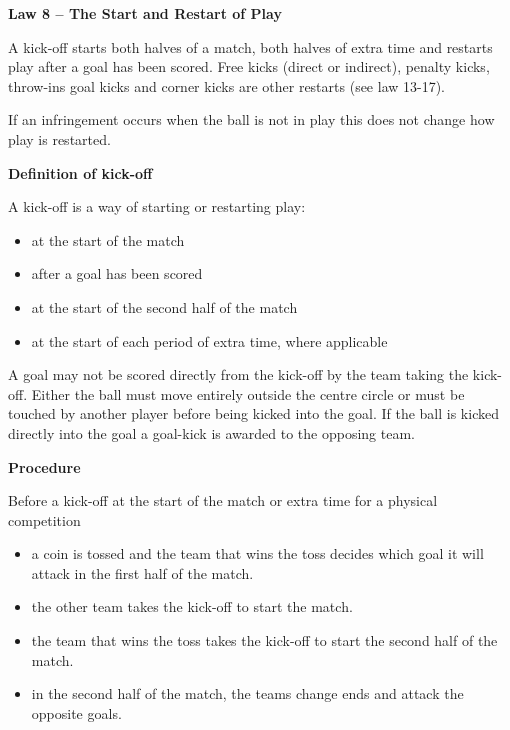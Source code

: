 \clearpage
\sffamily
{\bfseries\color[rgb]{0.4,0.4,0.4}
Law 8 -- The Start and Restart of Play}
{}

\bigskip

A kick-off starts both halves of a match, both halves of extra time and restarts
play after a goal has been scored.
Free kicks (direct or indirect), penalty kicks, throw-ins goal kicks and corner
kicks are other restarts (see law 13-17).

\bigskip

If an infringement occurs when the ball is not in play this does not change how
play is restarted.

\bigskip

{\bfseries Definition of kick-off}

\headlinebox

A kick-off is a way of starting or restarting play:

\begin{itemize}
\item at the start of the match 
\item after a goal has been scored 
\item at the start of the second half of the match 
\item at the start of each period of extra time, where applicable
\end{itemize}

A goal may not be scored directly from the kick-off by the team taking the kick-off.
Either the ball must move entirely outside the centre circle or must be touched
by another player before being kicked into the goal.
If the ball is kicked directly into the goal a goal-kick
is awarded to the opposing team.

\bigskip

{\bfseries Procedure }

\headlinebox

Before a kick-off at the start of the match or extra time for a physical competition

\begin{itemize}
\item a coin is tossed and the team that wins the toss decides which goal it will attack in the first half of the match.
\item the other team takes the kick-off to start the match.
\item the team that wins the toss takes the kick-off to start the second half of the match.
\item in the second half of the match, the teams change ends and attack the opposite goals. 
\end{itemize}

